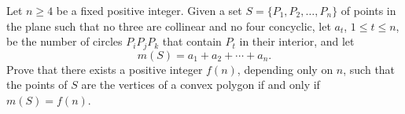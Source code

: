 Let $n \geq 4$ be a fixed positive integer. Given a set $S = \{P_1, P_2, \ldots, P_n\}$ of points in the plane such that no three are collinear and no four concyclic, let $a_t$, $1 \leq t \leq n$, be the number of circles $P_i P_j P_k$ that contain $P_t$ in their interior, and let
\[ m(S) = a_1 + a_2 + \cdots + a_n. \]
Prove that there exists a positive integer $f(n)$, depending only on $n$, such that the points of $S$ are the vertices of a convex polygon if and only if $m(S) = f(n)$.
